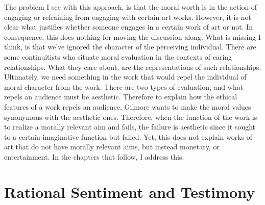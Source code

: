 \documentclass[phdthesis,12pt,final]{wuthesis}
\theoremstyle{definition}
\theoremstyle{definition}
\theoremstyle{definition}
\theoremstyle{definition}
\theoremstyle{remark}
\begin{document}
The problem I see with this approach, is that the moral worth is in the action of engaging or refraining from engaging with certain art works. However, it is not clear what justifies whether someone engages in a certain work of art or not. In consequence, this does nothing for moving the discussion along. What is missing I think, is that we've ignored the character of the perceiving individual. There are some continuitists who situate moral evaluation in the contexts of caring relationships. What they care about, are the representations of such relationships. Ultimately, we need something in the work that would repel the individual of moral character from the work. There are two types of evaluation, and what repels an audience must be aesthetic. Therefore to explain how the ethical features of a work repels an audience, Gilmore wants to make the moral values synonymous with the aesthetic ones. Therefore, when the function of the work is to realize a morally relevant aim and fails, the failure is aesthetic since it sought to a certain imaginative function but failed. Yet, this does not explain works of art that do not have morally relevant aims, but instead monetary, or entertainment. In the chapters that follow, I address this.

\chapter{Rational Sentiment and Testimony}\label{rational-sentiment-and-testimony}
\end{document}
